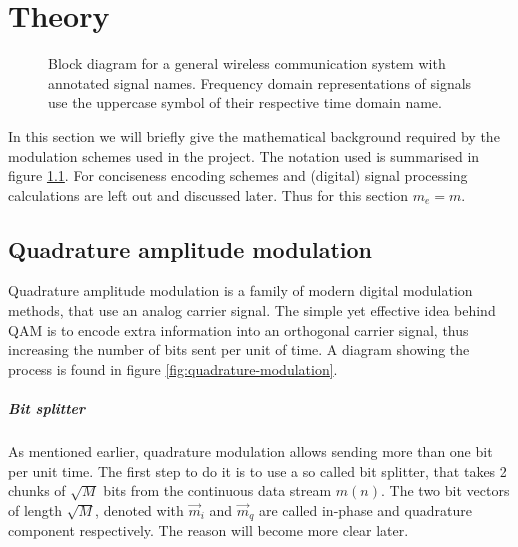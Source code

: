 
\chapter{Theory}

\begin{figure}
	\centering
	
	\caption{
		Block diagram for a general wireless communication system with annotated signal names. Frequency domain representations of signals use the uppercase symbol of their respective time domain name.
		\label{fig:notation}
	}
\end{figure}

In this section we will briefly give the mathematical background required by the modulation schemes used in the project. The notation used is summarised in figure \ref{fig:notation}. For conciseness encoding schemes and (digital) signal processing calculations are left out and discussed later. Thus for this section \(m_e = m\).


\section{Quadrature amplitude modulation}

Quadrature amplitude modulation is a family of modern digital modulation methods, that use an analog carrier signal. The simple yet effective idea behind QAM is to encode extra information into an orthogonal carrier signal, thus increasing the number of bits sent per unit of time. A diagram showing the process is found in figure \ref{fig:quadrature-modulation}.


\paragraph{Bit splitter}

As mentioned earlier, quadrature modulation allows sending more than one bit per unit time. The first step to do it is to use a so called bit splitter, that takes 2 chunks of \(\sqrt{M}\) bits from the continuous data stream \(m(n)\). The two bit vectors of length \(\sqrt{M}\), denoted with \(\vec{m}_i\) and \(\vec{m}_q\) are called in-phase and quadrature component respectively. The reason will become more clear later.

